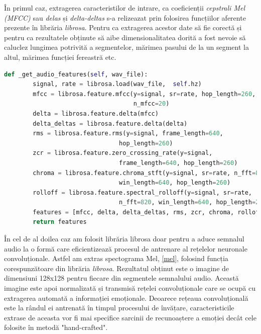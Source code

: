 \documentclass[a4paper,12pt]{book}
\begin{document}
				În primul caz, extragerea caracteristilor de intrare, ca coeficienții \textit{cepstrali Mel (MFCC)} sau \textit{delas} și \textit{delta-deltas} s-a relizeazat prin folosirea funcțiilor aferente prezente în librăria \textit{librosa}. Pentru ca extragerea acestor date să fie corectă și pentru ca rezultatele obținute să aibe dimensionalitatea dorită a fost nevoie să caluclez lungimea potrivită a segmentelor, mărimea pasului de la un segment la altul, mărimea funcției fereastră etc. \par
				
				\begin{lstlisting}[language=Python, caption={Extragerea caracteristicilor hand-crafted, 3.3, folosind libraria librosa.}, xleftmargin=0cm]
 def _get_audio_features(self, wav_file):
		signal, rate = librosa.load(wav_file,  self.hz)
		mfcc = librosa.feature.mfcc(y=signal, sr=rate, hop_length=260, 
									n_mfcc=20)
		delta = librosa.feature.delta(mfcc)
		delta_deltas = librosa.feature.delta(delta)
		rms = librosa.feature.rms(y=signal, frame_length=640, 
								hop_length=260)
		zcr = librosa.feature.zero_crossing_rate(y=signal, 
								frame_length=640, hop_length=260)
		chroma = librosa.feature.chroma_stft(y=signal, sr=rate, n_fft=820, 
								win_length=640,	hop_length=260)
		rolloff = librosa.feature.spectral_rolloff(y=signal, sr=rate, 
								n_fft=820, win_length=640, hop_length=260)
		features = [mfcc, delta, delta_deltas, rms, zcr, chroma, rolloff]
		return features	\end{lstlisting}
				
				În cel de al doilea caz am folosit librăria librosa doar pentru a aduce semnalul audio la o formă care eficientizează procesul de antrenare al rețelelor neuronale convoluționale. Astfel am extras spectograma Mel, \ref{mel}, folosind funcția corespunzătoare din librăria \textit{librosa}. Rezultatul obținut este o imagine de dimensiuni 128x128 pentru fiecare din segmentele semnalului audio. Această imagine este apoi normalizată și transmisă rețelei convoluționale care se ocupă cu extragerea automată a informației emoționale. Deoarece rețeaua convoluțională este la rândul ei antrenată în timpul procesului de învățare, caracteristicile extrase de aceasta vor fi mai specifice sarcinii de recunoaștere a emoției decât cele folosite în metodă "hand-crafted". \par
				
\end{document}
